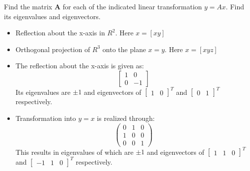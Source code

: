 Find the matrix $\boldsymbol{A}$ for each of the indicated linear transformation $y=Ax$. Find its eigenvalues and eigenvectors.
\begin{itemize}
	\item Reflection about the x-axis in $R^2$. Here $x=\left[x y \right]$
	\item Orthogonal projection of $R^3$ onto the plane $x=y$. Here $x=\left[x y z\right]$
\end{itemize}
\begin{itemize}
	\item The reflection about the x-axis is given as:
	\begin{equation*}
	\boxed{
		\begin{bmatrix}
			1&0\\0&-1
		\end{bmatrix}
		}
	\end{equation*}
	Its eigenvalues are $\pm 1$ and eigenvectors of $\begin{bmatrix}1 & 0\end{bmatrix}^T$ and $\begin{bmatrix}0 &1\end{bmatrix}^T$ respectively.

	\item Transformation into $y=x$ is realized through:
\begin{equation*}
	\begin{pmatrix}
		0&1&0\\
		1&0&0\\
		0&0&1
	\end{pmatrix}
\end{equation*}
This results in eigenvalues of which are $\pm 1$ and eigenvectors of $\begin{bmatrix}1 & 1& 0\end{bmatrix}^T$ and $\begin{bmatrix}-1&1 &0\end{bmatrix}^T$ respectively.
\end{itemize}